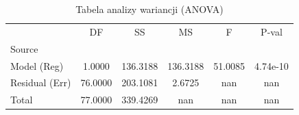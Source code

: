 \begin{table}[H]
\caption{Tabela analizy wariancji (ANOVA)}
\label{tab:zad2_anova}
\begin{tabular}{lccccc}
\toprule
 & DF & SS & MS & F & P-val \\
Source &  &  &  &  &  \\
\midrule
Model (Reg) & 1.0000 & 136.3188 & 136.3188 & 51.0085 & 4.74e-10 \\
Residual (Err) & 76.0000 & 203.1081 & 2.6725 & nan & nan \\
Total & 77.0000 & 339.4269 & nan & nan & nan \\
\bottomrule
\end{tabular}
\end{table}
